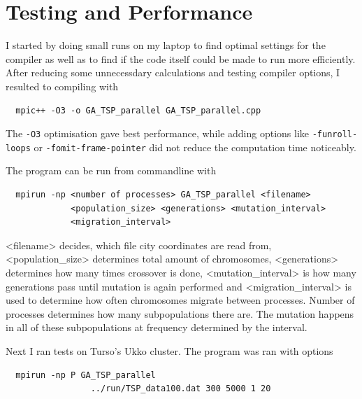 \documentclass[12pt]{article}
\begin{document}
\section{Testing and Performance}

I started by doing small runs on my laptop to find optimal settings for the compiler as well as
to find if the code itself could be made to run more efficiently. After reducing some unnecessdary
calculations and testing compiler options, I resulted to compiling with
\begin{lstlisting}
  mpic++ -O3 -o GA_TSP_parallel GA_TSP_parallel.cpp
\end{lstlisting}

The \lstinline!-O3! optimisation gave best performance, while adding options like
\lstinline!-funroll-loops! or \lstinline!-fomit-frame-pointer! did not reduce the computation time
noticeably.

The program can be run from commandline with
\begin{lstlisting}
  mpirun -np <number of processes> GA_TSP_parallel <filename>
             <population_size> <generations> <mutation_interval>
             <migration_interval>
\end{lstlisting}
           
<filename> decides, which file city coordinates are read from,
<population\_size> determines total amount of chromosomes, <generations>
determines how many times crossover is done, <mutation\_interval> is how many generations
pass until mutation is again performed and <migration\_interval> is used to determine how
often chromosomes migrate between processes. Number of processes determines how many subpopulations
there are. The mutation happens in all of these subpopulations at frequency determined by the
interval.

Next I ran tests on Turso's Ukko cluster. The program was ran with options
\begin{lstlisting}
  mpirun -np P GA_TSP_parallel
                 ../run/TSP_data100.dat 300 5000 1 20
\end{lstlisting}
\end{document}
